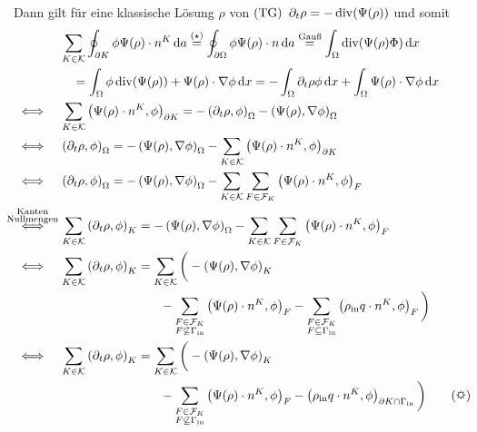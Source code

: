 Dann gilt für eine klassische Lösung $ \rho $ von $ \operatorname{(TG)} $  $ \partial_t \rho = - \operatorname{div}(\Psi(\rho)) $ und somit
\begin{align*}
	&&&\sum_{K \in \mathcal{K}} \oint_{\partial K} \phi \Psi(\rho) \cdot n^K \diff a \stackrel{(\star)}{=} \oint_{\partial \Omega} \phi \Psi(\rho) \cdot n \diff a \stackrel{\text{Gauß}}{=} \int_{\Omega} \dive(\Psi(\rho) \Phi) \diff x \\
	&&& \quad = \int_{\Omega} \phi \dive(\Psi(\rho)) + \Psi(\rho) \cdot \nabla \phi \diff x = - \int_\Omega \partial_t \rho \phi \diff x + \int_\Omega \Psi(\rho) \cdot \nabla \phi \diff x \\
	&\iff &&\sum_{K \in \mathcal{K}} \left(\Psi(\rho) \cdot n^K, \phi \right)_{\partial K} = - \left(\partial_t \rho, \phi  \right)_\Omega - \left(\Psi(\rho), \nabla\phi  \right)_\Omega \\
	&\iff && \left(\partial_t \rho, \phi  \right)_\Omega  = - \left(\Psi(\rho), \nabla\phi  \right)_\Omega - \sum_{K \in \mathcal{K} } \left(\Psi(\rho) \cdot n^K, \phi \right)_{\partial K} \\
	&\iff &&\left(\partial_t \rho, \phi  \right)_\Omega  = - \left(\Psi(\rho), \nabla \phi  \right)_\Omega - \sum_{K \in \mathcal{K}} \sum_{F \in \mathcal{F}_K} \left(\Psi(\rho) \cdot n^K, \phi \right)_{F} \\
	&\stackrel{\mathclap{\substack{\text{Kanten} \\ \text{Nullmengen}}}}{\iff} &&\sum_{K \in \mathcal{K}} \left(\partial_t \rho, \phi  \right)_K  = - \left(\Psi(\rho), \nabla \phi  \right)_\Omega - \sum_{K \in \mathcal{K}} \sum_{F \in \mathcal{F}_K} \left(\Psi(\rho) \cdot n^K, \phi \right)_{F} \\
	&\iff  &&\sum_{K \in \mathcal{K}} \left(\partial_t \rho, \phi  \right)_K  = \sum_{K \in \mathcal{K}} \bigg( - \left(\Psi(\rho), \nabla \phi \right)_K\\
	&&&\qquad\qquad\qquad\qquad -\sum_{\substack{F \in \mathcal{F}_K \\ F \not\subseteq \Gammain}} \left(\Psi(\rho) \cdot n^K, \phi \right)_{F}- \sum_{\substack{F \in \mathcal{F}_K \\ F \subseteq \Gammain}} \left(\rhoin q \cdot n^K, \phi \right)_{F} \bigg)\\
	&\iff  &&\sum_{K \in \mathcal{K}} \left(\partial_t \rho, \phi  \right)_K  = \sum_{K \in \mathcal{K}} \bigg( -\left(\Psi(\rho), \nabla\phi \right)_K \\
	&&& \qquad\qquad\qquad\qquad -\sum_{\substack{F \in \mathcal{F}_K \\ F \not\subseteq \Gammain}} \left(\Psi(\rho) \cdot n^K, \phi \right)_{F} - \left(\rhoin q \cdot n^K, \phi \right)_{\partial K \cap \Gammain} \bigg) \tag{\sun}
\end{align*}
